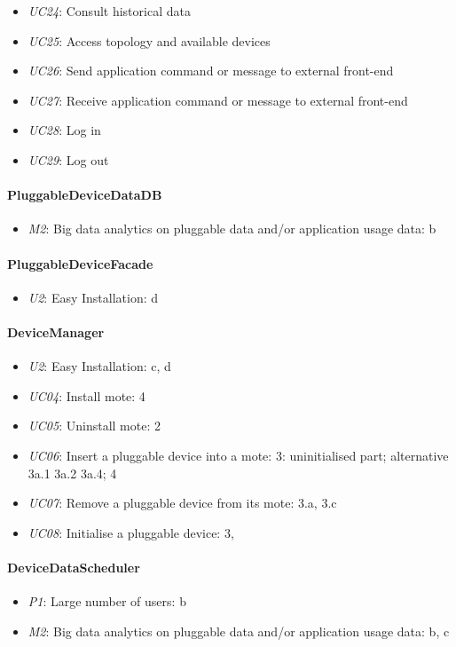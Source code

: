 \begin{itemize}
            \item \emph{UC24}: Consult historical data
            \item \emph{UC25}: Access topology and available devices
            \item \emph{UC26}: Send application command or message to external front-end
            \item \emph{UC27}: Receive application command or message to external front-end
            \item \emph{UC28}: Log in
            \item \emph{UC29}: Log out
        \end{itemize}

    \paragraph{PluggableDeviceDataDB}
        \begin{itemize}
            \item \emph{M2}: Big data analytics on pluggable data and/or application usage data: b
        \end{itemize}

    \paragraph{PluggableDeviceFacade}
        \begin{itemize}
        	\item \emph{U2}: Easy Installation: d
        \end{itemize}

    \paragraph{DeviceManager}
        \begin{itemize}
            \item \emph{U2}: Easy Installation: c, d
            \item \emph{UC04}: Install mote: 4
            \item \emph{UC05}: Uninstall mote: 2
            \item \emph{UC06}: Insert a pluggable device into a mote: 3: uninitialised part; alternative 3a.1 3a.2 3a.4; 4
            \item \emph{UC07}: Remove a pluggable device from its mote: 3.a, 3.c
            \item \emph{UC08}: Initialise a pluggable device: 3,
        \end{itemize}

    \paragraph{DeviceDataScheduler}
        \begin{itemize}
            \item \emph{P1}: Large number of users: b
            \item \emph{M2}: Big data analytics on pluggable data and/or application usage data: b, c
        \end{itemize}
